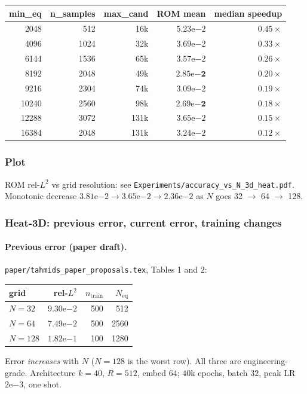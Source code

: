\begin{center}
\begin{tabular}{r r r r r}
  \textbf{min\_eq} & \textbf{n\_samples} & \textbf{max\_cand} & \textbf{ROM mean} & \textbf{median speedup} \\
  \hline
  2048   & 512  & 16k  & $5.23\mathrm{e}{-2}$ & $0.45\times$ \\
  4096   & 1024 & 32k  & $3.69\mathrm{e}{-2}$ & $0.33\times$ \\
  6144   & 1536 & 65k  & $3.57\mathrm{e}{-2}$ & $0.26\times$ \\
  8192   & 2048 & 49k  & $\mathbf{2.85\mathrm{e}{-2}}$ & $0.20\times$ \\
  9216   & 2304 & 74k  & $3.09\mathrm{e}{-2}$ & $0.19\times$ \\
  10240  & 2560 & 98k  & $\mathbf{2.69\mathrm{e}{-2}}$ & $0.18\times$ \\
  12288  & 3072 & 131k & $3.65\mathrm{e}{-2}$ & $0.15\times$ \\
  16384  & 2048 & 131k & $3.24\mathrm{e}{-2}$ & $0.12\times$ \\
\end{tabular}
\end{center}

\subsubsection*{Plot}
ROM rel-$L^2$ vs grid resolution: see
\texttt{Experiments/accuracy\_vs\_N\_3d\_heat.pdf}.
Monotonic decrease $3.81\mathrm{e}{-2} \to 3.65\mathrm{e}{-2} \to 2.36\mathrm{e}{-2}$
as $N$ goes 32 $\to$ 64 $\to$ 128.

\subsubsection*{Heat-3D: previous error, current error, training changes}

\paragraph{Previous error (paper draft).}
\texttt{paper/tahmids\_paper\_proposals.tex}, Tables 1 and 2:
\begin{center}
\begin{tabular}{l r r r}
  \textbf{grid} & \textbf{rel-$L^2$} & $n_\mathrm{train}$ & $N_\mathrm{eq}$ \\
  \hline
  $N=32$  & $9.30\mathrm{e}{-2}$ & 500  & 512  \\
  $N=64$  & $7.49\mathrm{e}{-2}$ & 500  & 2560 \\
  $N=128$ & $1.82\mathrm{e}{-1}$ & 100  & 1280 \\
\end{tabular}
\end{center}
Error \emph{increases} with $N$ ($N=128$ is the worst row). All three are
engineering-grade. Architecture $k{=}40$, $R{=}512$, embed $64$;
$40$k epochs, batch $32$, peak LR $2\mathrm{e}{-3}$, one shot.

